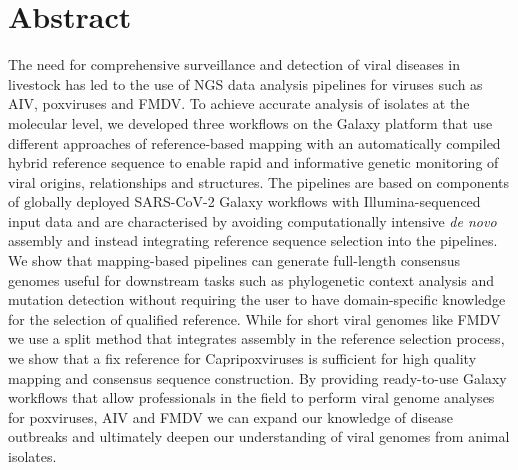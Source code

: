 \chapter*{Abstract}
The need for comprehensive surveillance and detection of viral diseases in livestock has led to the use of \ac{NGS} data analysis pipelines for viruses such as \ac{AIV}, poxviruses and \ac{FMDV}. To achieve accurate analysis of isolates at the molecular level, we developed three workflows on the Galaxy platform that use different approaches of reference-based mapping with an automatically compiled hybrid reference sequence to enable rapid and informative genetic monitoring of viral origins, relationships and structures. The pipelines are based on components of globally deployed SARS-CoV-2 Galaxy workflows with Illumina-sequenced input data and are characterised by avoiding computationally intensive \textit{de novo} assembly and instead integrating reference sequence selection into the pipelines. We show that mapping-based pipelines can generate full-length consensus genomes useful for downstream tasks such as phylogenetic context analysis and mutation detection without requiring the user to have domain-specific knowledge for the selection of qualified reference. While for short viral genomes like FMDV we use a split method that integrates assembly in the reference selection process, we show that a fix reference for Capripoxviruses is sufficient for high quality mapping and consensus sequence construction. By providing ready-to-use Galaxy workflows that allow professionals in the field to perform viral genome analyses for poxviruses, AIV and FMDV we can expand our knowledge of disease outbreaks and ultimately deepen our understanding of viral genomes from animal isolates.